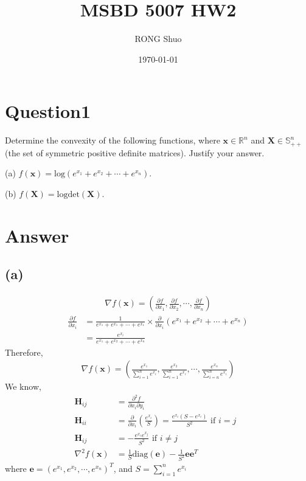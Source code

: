 \documentclass{article}
\title{MSBD 5007 HW2}
\author{RONG Shuo}
\date{\today}
\newcommand{\R}{\mathbb{R}}
\begin{document}
\maketitle

\section*{Question1}
Determine the convexity of the following functions, where \(\bm{x} \in \R^n \) and \(\bm{X} \in \mathbb{S}_{++}^{n}\)(the set of symmetric positive definite matrices). Justify your answer.

(a) \(f(\bm{x}) = \text{log}(e^{x_1} + e^{x_2} + \cdots + e^{x_n})\).

(b) \(f(\bm{X}) = \text{log} \text{det}(\bm{X})\).

\section*{Answer}
\subsection*{(a)}
\begin{align*}
    \nabla f(\bm{x}) = (\frac{\partial f}{\partial x_1}, \frac{\partial f}{\partial x_2}, \cdots, \frac{\partial f}{\partial x_n})
\end{align*}
\begin{align*}
    \frac{\partial f}{\partial x_i} &= \frac{1}{e^{x_1} + e^{x_1} + \cdots + e^{x_1}} \times \frac{\partial }{\partial x_i} (e^{x_1} + e^{x_2} + \cdots + e^{x_n}) \\
    &=  \frac{e^{x_i}}{e^{x_1} + e^{x_2} + \cdots + e^{x_n}} 
\end{align*}
Therefore,
\begin{align*}
    \nabla f(\bm{x}) = (\frac{e^{x_1}}{\sum_{i = 1}^{n} e^{x_i}}, \frac{e^{x_2}}{\sum_{i = 1}^{n} e^{x_i}}, \cdots ,\frac{e^{x_n}}{\sum_{i = n}^{n} e^{x_i}})
\end{align*}
We know,
\begin{align*}
    \bm{H}_{ij} &= \frac{\partial^2 f}{\partial x_i \partial y_i} \\
    \bm{H}_{ii} &= \frac{\partial}{\partial x_i} (\frac{e^{x_i}}{S}) = \frac{e^{x_i} (S - e^{x_i})}{S^2} \text{    if \(i = j\) } \\ 
    \bm{H}_{ij} &= -\frac{e^{x_i}e^{x_j}}{S^2} \text{    if \(i \neq j\) } \\
    \nabla^2 f(\bm{x}) &= \frac{1}{S}\text{diag}(\bm{e}) - \frac{1}{S^2}\bm{e}\bm{e}^T
\end{align*}
where \( \bm{e} = (e^{x_1},  e^{x_2}, \cdots, e^{x_n} )^T \), and \(S = \sum_{i = 1}^{n} e^{x_i}\)
\end{document}
